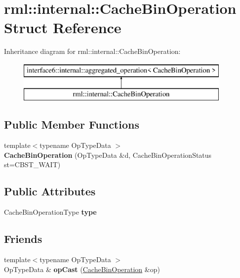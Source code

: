 \hypertarget{structrml_1_1internal_1_1CacheBinOperation}{}\section{rml\+:\+:internal\+:\+:Cache\+Bin\+Operation Struct Reference}
\label{structrml_1_1internal_1_1CacheBinOperation}
Inheritance diagram for rml\+:\+:internal\+:\+:Cache\+Bin\+Operation\+:\begin{figure}[H]
\begin{center}
\leavevmode
\includegraphics[height=2.000000cm]{structrml_1_1internal_1_1CacheBinOperation}
\end{center}
\end{figure}
\subsection*{Public Member Functions}
\begin{DoxyCompactItemize}
\item 
\hypertarget{structrml_1_1internal_1_1CacheBinOperation_ac12d12123353afcd98363d40c35d810a}{}{\footnotesize template$<$typename Op\+Type\+Data $>$ }\\{\bfseries Cache\+Bin\+Operation} (Op\+Type\+Data \&d, Cache\+Bin\+Operation\+Status st=C\+B\+S\+T\+\_\+\+W\+A\+I\+T)\label{structrml_1_1internal_1_1CacheBinOperation_ac12d12123353afcd98363d40c35d810a}

\end{DoxyCompactItemize}
\subsection*{Public Attributes}
\begin{DoxyCompactItemize}
\item 
\hypertarget{structrml_1_1internal_1_1CacheBinOperation_a7969bcfed65edafde21727551b35587c}{}Cache\+Bin\+Operation\+Type {\bfseries type}\label{structrml_1_1internal_1_1CacheBinOperation_a7969bcfed65edafde21727551b35587c}

\end{DoxyCompactItemize}
\subsection*{Friends}
\begin{DoxyCompactItemize}
\item 
\hypertarget{structrml_1_1internal_1_1CacheBinOperation_a6a11bea988feb31a113371c610f7a6d1}{}{\footnotesize template$<$typename Op\+Type\+Data $>$ }\\Op\+Type\+Data \& {\bfseries op\+Cast} (\hyperlink{structrml_1_1internal_1_1CacheBinOperation}{Cache\+Bin\+Operation} \&op)\label{structrml_1_1internal_1_1CacheBinOperation_a6a11bea988feb31a113371c610f7a6d1}

\end{DoxyCompactItemize}


